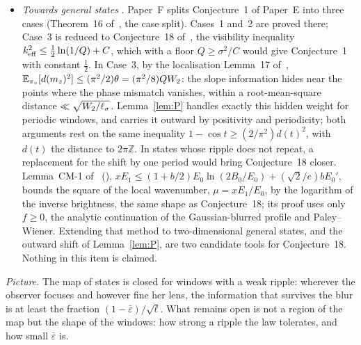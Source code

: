 \begin{itemize}
\item \emph{Towards general states} . Paper~F splits Conjecture~1 of Paper~E into three cases (Theorem~16 of~\cite{F}, the case split). Cases~1 and~2 are proved there; Case~3 is reduced to Conjecture~18 of~\cite{F}, the visibility inequality $k_{\mathrm{eff}}^2\le\frac12\ln(1/Q)+C$, which with a floor $Q\ge\sigma^2/C$ would give Conjecture~1 with constant $\frac12$. In Case~3, by the localisation Lemma~17 of~\cite{F}, $\mathbb{E}_{\pi_v}[d(m_z)^2]\le(\pi^2/2)\theta=(\pi^2/8)QW_2$: the slope information hides near the points where the phase mismatch vanishes, within a root-mean-square distance $\ll\sqrt{W_2/\ell_\sigma}$. Lemma~\ref{lem:P} handles exactly this hidden weight for periodic windows, and carries it outward by positivity and periodicity; both arguments rest on the same inequality $1-\cos t\ge(2/\pi^2)d(t)^2$, with $d(t)$ the distance to $2\pi\mathbb Z$. In states whose ripple does not repeat, a replacement for the shift by one period would bring Conjecture~18 closer. Lemma~CM-1 of~\cite{H} (), $xE_1\le(1+b/2)E_0\ln(2B_0/E_0)+(\sqrt2/e)bE_0'$, bounds the square of the local wavenumber, $\mu=xE_1/E_0$, by the logarithm of the inverse brightness, the same shape as Conjecture~18; its proof uses only $f\ge0$, the analytic continuation of the Gaussian-blurred profile and Paley--Wiener. Extending that method to two-dimensional general states, and the outward shift of Lemma~\ref{lem:P}, are two candidate tools for Conjecture~18. Nothing in this item is claimed.
\end{itemize}

\emph{Picture.}
The map of states is closed for windows with a weak ripple: wherever the observer focuses and however fine her lens, the information that survives the blur is at least the fraction $(1-\bar\varepsilon)/\sqrt\ell$.
What remains open is not a region of the map but the shape of the windows: how strong a ripple the law tolerates, and how small $\bar\varepsilon$ is.
